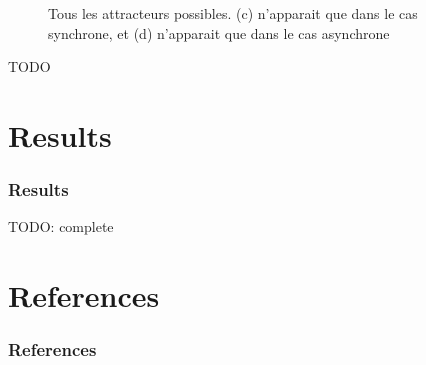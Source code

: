 \documentclass{beamer}
\begin{document}
\begin{frame}
\begin{figure}
\caption{Tous les attracteurs possibles. (c) n'apparait que dans le cas synchrone, et (d) n'apparait que dans le cas asynchrone}
\end{figure}

\end{frame}

\begin{frame}
  TODO
\end{frame}



\section{Results}

\begin{frame}
  \frametitle{Results}
  TODO: complete
\end{frame}


\section*{References}

\begin{frame}
  \frametitle{References}
  
  
\end{frame}
\end{document}
